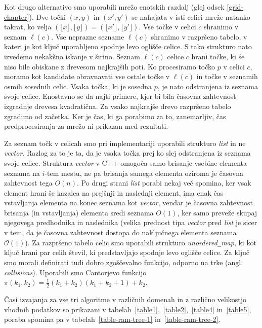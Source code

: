 \documentclass[a4paper, 12pt]{book}
\newcommand{\OO}{\ensuremath{\mathcal{O}}} %
\newcommand{\U}{\texttt{\_}}
\begin{document}
Kot drugo alternativo smo uporabili mrežo enotskih razdalj (glej odsek \ref{grid-chapter}). Dve točki $(x,y)$ in $(x',y')$ se nahajata v isti celici mreže natanko takrat, ko velja $(\lfloor x\rfloor ,\lfloor y\rfloor)=(\lfloor x'\rfloor ,\lfloor y'\rfloor)$. Vse točke v celici $c$ shranimo v seznam $\ell(c)$. Vse neprazne sezname $\ell(c)$ shranimo v razpršeno tabelo, v kateri je kot ključ uporabljeno spodnje levo oglišče celice. S tako strukturo nato izvedemo nekakšno iskanje v širino. Seznam $\ell(c)$ celice $c$ hrani točke, ki še niso bile ob\-iskane z drevesom najkrajših poti. Ko procesiramo točko $p$ v celici $c$, moramo kot kandidate obravnavati vse ostale točke v $\ell(c)$ in točke v seznamih osmih sosednih celic. Vsaka točka, ki je sosedna $p$, je nato odstranjena iz seznama svoje celice. Enostavno se da najti primere, kjer bi bila časovna zahtevnost izgradnje drevesa kvadratična. Za vsako najkrajše drevo razpršeno tabelo zgradimo od začetka. Ker je čas, ki ga porabimo za to, zanemarljiv, čas predprocesiranja za mrežo ni prikazan med rezultati. 

Za seznam točk v celicah smo pri implementaciji uporabili strukturo \textit{list} in ne \textit{vector}. Razlog za to je ta, da je vsaka točka prej ko slej odstranjena iz seznama svoje celice. Struktura \textit{vector} v C++ omogoča samo brisanje vsebine elementa seznama na $i$-tem mestu, ne pa brisanja samega elementa oziroma je časovna zahtevnost tega $O(n)$. Po drugi strani \textit{list} porabi nekaj več spomina, ker vsak element hrani še kazalca na prejšnji in naslednji element, ima enak čas vstavljanja elementa na konec seznama kot \textit{vector}, vendar je časovna zahtevnost brisanja (in vstavljanja) elementa sredi seznama $O(1)$, ker samo preveže skupaj njegovega predhodnika in naslednika (velika prednost tipa \textit{vector} pred \textit{list} je sicer v tem, da je časovna zahtevnost dostopa do naključnega elementa seznama $\OO(1)$). Za razpršeno tabelo celic smo uporabili strukturo \textit{unordered\U map}, ki kot ključ hrani par celih števil, ki predstavljajo spodnje levo oglišče celice. Za ključ smo morali definirati tudi dobro zgoščevalno funkcijo, odporno na trke (angl. \textit{collisions}). Uporabili smo Cantorjevo funkcijo $\pi (k_1, k_2) = \frac{1}{2}(k_1+k_2)(k_1+k_2+1) + k_2$.

Časi izvajanja za vse tri algoritme v različnih domenah in z različno velikostjo vhodnih podatkov so prikazani v tabelah~\ref{table1},~\ref{table2},~\ref{table4} in~\ref{table5}, poraba spomina pa v tabelah~\ref{table-ram-tree-1} in~\ref{table-ram-tree-2}.
\end{document}
